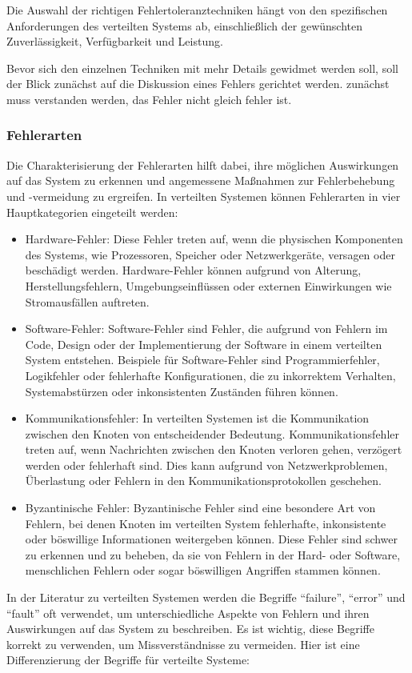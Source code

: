 Die Auswahl der richtigen Fehlertoleranztechniken hängt von den spezifischen Anforderungen des verteilten Systems ab, einschließlich der gewünschten Zuverlässigkeit, Verfügbarkeit und Leistung.

Bevor sich den einzelnen Techniken mit mehr Details gewidmet werden soll, soll der Blick zunächst auf die Diskussion eines Fehlers gerichtet werden. zunächst muss verstanden werden, das Fehler nicht gleich fehler ist. 
\subsubsection{Fehlerarten}
Die Charakterisierung der Fehlerarten hilft dabei, ihre möglichen Auswirkungen auf das System zu erkennen und angemessene Maßnahmen zur Fehlerbehebung und -vermeidung zu ergreifen.
In verteilten Systemen können Fehlerarten in vier Hauptkategorien eingeteilt werden:
\begin{itemize}
\item Hardware-Fehler: Diese Fehler treten auf, wenn die physischen Komponenten des Systems, wie Prozessoren, Speicher oder Netzwerkgeräte, versagen oder beschädigt werden. Hardware-Fehler können aufgrund von Alterung, Herstellungsfehlern, Umgebungseinflüssen oder externen Einwirkungen wie Stromausfällen auftreten.
\item Software-Fehler: Software-Fehler sind Fehler, die aufgrund von Fehlern im Code, Design oder der Implementierung der Software in einem verteilten System entstehen. Beispiele für Software-Fehler sind Programmierfehler, Logikfehler oder fehlerhafte Konfigurationen, die zu inkorrektem Verhalten, Systemabstürzen oder inkonsistenten Zuständen führen können.
\item Kommunikationsfehler: In verteilten Systemen ist die Kommunikation zwischen den Knoten von entscheidender Bedeutung. Kommunikationsfehler treten auf, wenn Nachrichten zwischen den Knoten verloren gehen, verzögert werden oder fehlerhaft sind. Dies kann aufgrund von Netzwerkproblemen, Überlastung oder Fehlern in den Kommunikationsprotokollen geschehen.
\item Byzantinische Fehler: Byzantinische Fehler sind eine besondere Art von Fehlern, bei denen Knoten im verteilten System fehlerhafte, inkonsistente oder böswillige Informationen weitergeben können. Diese Fehler sind schwer zu erkennen und zu beheben, da sie von Fehlern in der Hard- oder Software, menschlichen Fehlern oder sogar böswilligen Angriffen stammen können.
\end{itemize}
In der Literatur zu verteilten Systemen werden die Begriffe \enquote{failure}, \enquote{error} und \enquote{fault} oft verwendet, um unterschiedliche Aspekte von Fehlern und ihren Auswirkungen auf das System zu beschreiben. Es ist wichtig, diese Begriffe korrekt zu verwenden, um Missverständnisse zu vermeiden. Hier ist eine Differenzierung der Begriffe für verteilte Systeme:
